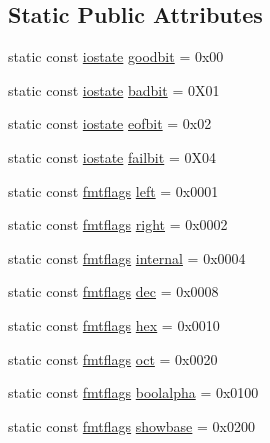 \subsection*{Static Public Attributes}
\begin{DoxyCompactItemize}
\item 
static const \hyperlink{classios__base_aef19291eeae0f072ac42c6ba1fe3033c}{iostate} \hyperlink{classios__base_a07a00996a6e525b88bdfe7935d5ead05}{goodbit} = 0x00
\item 
static const \hyperlink{classios__base_aef19291eeae0f072ac42c6ba1fe3033c}{iostate} \hyperlink{classios__base_ac8c2c8f2f6bc9e6ce101c20e88ebce35}{badbit} = 0\+X01
\item 
static const \hyperlink{classios__base_aef19291eeae0f072ac42c6ba1fe3033c}{iostate} \hyperlink{classios__base_af75072b7ef2a931c77a2cb8e7ccda460}{eofbit} = 0x02
\item 
static const \hyperlink{classios__base_aef19291eeae0f072ac42c6ba1fe3033c}{iostate} \hyperlink{classios__base_a36157154001bcce17827db6786e35efd}{failbit} = 0\+X04
\item 
static const \hyperlink{classios__base_ac9a54e52cef4f01ac0afd8ae896a3413}{fmtflags} \hyperlink{classios__base_ad364df9af2cfde1f40bd8e10c62bb215}{left} = 0x0001
\item 
static const \hyperlink{classios__base_ac9a54e52cef4f01ac0afd8ae896a3413}{fmtflags} \hyperlink{classios__base_aec064a12730b5d87e718c1864e29ac64}{right} = 0x0002
\item 
static const \hyperlink{classios__base_ac9a54e52cef4f01ac0afd8ae896a3413}{fmtflags} \hyperlink{classios__base_afc720b7f6f461ec8e9cf5505059e5d7c}{internal} = 0x0004
\item 
static const \hyperlink{classios__base_ac9a54e52cef4f01ac0afd8ae896a3413}{fmtflags} \hyperlink{classios__base_a2826aed005e7c1f6858060cddae7971a}{dec} = 0x0008
\item 
static const \hyperlink{classios__base_ac9a54e52cef4f01ac0afd8ae896a3413}{fmtflags} \hyperlink{classios__base_a3608e51eb0a80ea94ddadd5b713a3750}{hex} = 0x0010
\item 
static const \hyperlink{classios__base_ac9a54e52cef4f01ac0afd8ae896a3413}{fmtflags} \hyperlink{classios__base_a4155540f8d3ffdb8d25a2f50ee4df08f}{oct} = 0x0020
\item 
static const \hyperlink{classios__base_ac9a54e52cef4f01ac0afd8ae896a3413}{fmtflags} \hyperlink{classios__base_afa74acd95d4bbc7cc3551251aac2bf00}{boolalpha} = 0x0100
\item 
static const \hyperlink{classios__base_ac9a54e52cef4f01ac0afd8ae896a3413}{fmtflags} \hyperlink{classios__base_a7e3373ab307feecfc228bc9bdb29cd01}{showbase} = 0x0200

\end{DoxyCompactItemize}
